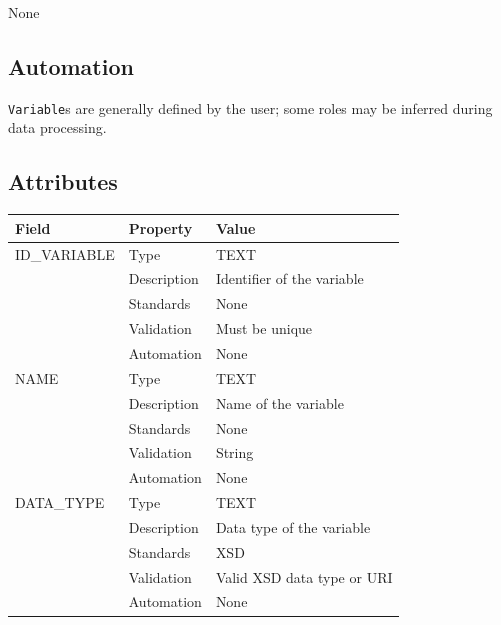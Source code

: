 \documentclass[
]{article}
\newcounter{none} %
\begin{document}
None

\subsection{Automation}\label{automation-40}

\texttt{Variable}s are generally defined by the user; some roles may be
inferred during data processing.

\subsection{Attributes}\label{attributes-34}

{\def\LTcaptype{none} %
\begin{longtable}[]{@{}
  >{\raggedright\arraybackslash}p{}
  >{\raggedright\arraybackslash}p{}
  >{\raggedright\arraybackslash}p{}@{}}
\toprule\noalign{}
\begin{minipage}[b]{\linewidth}\raggedright
Field
\end{minipage} & \begin{minipage}[b]{\linewidth}\raggedright
Property
\end{minipage} & \begin{minipage}[b]{\linewidth}\raggedright
Value
\end{minipage} \\
\midrule\noalign{}
\endhead
\bottomrule\noalign{}
\endlastfoot
ID\_VARIABLE & Type & TEXT \\
& Description & Identifier of the variable \\
& Standards & None \\
& Validation & Must be unique \\
& Automation & None \\
NAME & Type & TEXT \\
& Description & Name of the variable \\
& Standards & None \\
& Validation & String \\
& Automation & None \\
DATA\_TYPE & Type & TEXT \\
& Description & Data type of the variable \\
& Standards & XSD \\
& Validation & Valid XSD data type or URI \\
& Automation & None \\

\end{longtable}}
\end{document}
